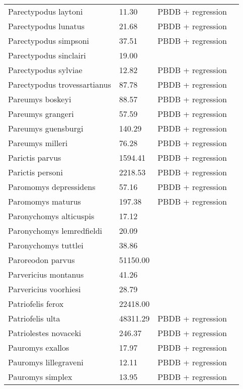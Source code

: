\documentclass{article}
\begin{document}
\begin{center}
\begin{longtable}{p{} p{} p{} p{}}
    Parectypodus laytoni & 11.30 & PBDB + regression &  \\ 
    Parectypodus lunatus & 21.68 & PBDB + regression &  \\ 
    Parectypodus simpsoni & 37.51 & PBDB + regression &  \\ 
    Parectypodus sinclairi & 19.00 & \cite{Wilson2012} &  \\ 
    Parectypodus sylviae & 12.82 & PBDB + regression &  \\ 
    Parectypodus trovessartianus & 87.78 & PBDB + regression &  \\ 
    Pareumys boskeyi & 88.57 & PBDB + regression &  \\ 
    Pareumys grangeri & 57.59 & PBDB + regression &  \\ 
    Pareumys guensburgi & 140.29 & PBDB + regression &  \\ 
    Pareumys milleri & 76.28 & PBDB + regression &  \\ 
    Parictis parvus & 1594.41 & PBDB + regression &  \\ 
    Parictis personi & 2218.53 & PBDB + regression &  \\ 
    Paromomys depressidens & 57.16 & PBDB + regression &  \\ 
    Paromomys maturus & 197.38 & PBDB + regression &  \\ 
    Paronychomys alticuspis & 17.12 & \cite{Tomiya2013} &  \\ 
    Paronychomys lemredfieldi & 20.09 & \cite{Tomiya2013} &  \\ 
    Paronychomys tuttlei & 38.86 & \cite{Tomiya2013} &  \\ 
    Paroreodon parvus & 51150.00 & \cite{McKenna2011} &  \\ 
    Parvericius montanus & 41.26 & \cite{Tomiya2013} &  \\ 
    Parvericius voorhiesi & 28.79 & \cite{Tomiya2013} &  \\ 
    Patriofelis ferox & 22418.00 & \cite{McKenna2011} &  \\ 
    Patriofelis ulta & 48311.29 & PBDB + regression &  \\ 
    Patriolestes novaceki & 246.37 & PBDB + regression &  \\ 
    Pauromys exallos & 17.97 & PBDB + regression &  \\ 
    Pauromys lillegraveni & 12.11 & PBDB + regression &  \\ 
    Pauromys simplex & 13.95 & PBDB + regression &  \\ 

\end{longtable}
\end{center}
\end{document}
